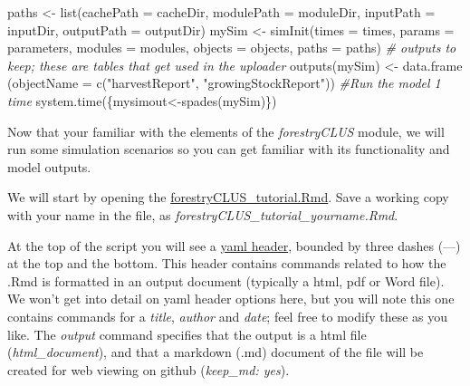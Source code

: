 \documentclass[
]{article}
\newenvironment{Shaded}{\begin{snugshade}}{\end{snugshade}}
\newcommand{\AttributeTok}[1]{\textcolor[rgb]{0.77,0.63,0.00}{#1}}
\newcommand{\CommentTok}[1]{\textcolor[rgb]{0.56,0.35,0.01}{\textit{#1}}}
\newcommand{\FunctionTok}[1]{\textcolor[rgb]{0.00,0.00,0.00}{#1}}
\newcommand{\NormalTok}[1]{#1}
\newcommand{\OtherTok}[1]{\textcolor[rgb]{0.56,0.35,0.01}{#1}}
\newcommand{\StringTok}[1]{\textcolor[rgb]{0.31,0.60,0.02}{#1}}
\begin{document}
\begin{Shaded}
\begin{Highlighting}[]
\NormalTok{paths }\OtherTok{\textless{}{-}} \FunctionTok{list}\NormalTok{(}\AttributeTok{cachePath =}\NormalTok{ cacheDir,}
              \AttributeTok{modulePath =}\NormalTok{ moduleDir,}
              \AttributeTok{inputPath =}\NormalTok{ inputDir,}
              \AttributeTok{outputPath =}\NormalTok{ outputDir)}
\NormalTok{mySim }\OtherTok{\textless{}{-}} \FunctionTok{simInit}\NormalTok{(}\AttributeTok{times =}\NormalTok{ times, }
                 \AttributeTok{params =}\NormalTok{ parameters, }
                 \AttributeTok{modules =}\NormalTok{ modules,}
                 \AttributeTok{objects =}\NormalTok{ objects, }
                 \AttributeTok{paths =}\NormalTok{ paths)}
\CommentTok{\# outputs to keep; these are tables that get used in the uploader}
\FunctionTok{outputs}\NormalTok{(mySim) }\OtherTok{\textless{}{-}} \FunctionTok{data.frame}\NormalTok{ (}\AttributeTok{objectName =} \FunctionTok{c}\NormalTok{(}\StringTok{"harvestReport"}\NormalTok{,}
                                             \StringTok{"growingStockReport"}\NormalTok{))}
\CommentTok{\#Run the model 1 time}
\FunctionTok{system.time}\NormalTok{(\{mysimout}\OtherTok{\textless{}{-}}\FunctionTok{spades}\NormalTok{(mySim)\})}
\end{Highlighting}
\end{Shaded}

Now that your familiar with the elements of the \emph{forestryCLUS}
module, we will run some simulation scenarios so you can get familiar
with its functionality and model outputs.

We will start by opening the
\href{https://github.com/bcgov/clus/blob/main/R/SpaDES-modules/forestryCLUS/forestryCLUS_tutorial.Rmd}{forestryCLUS\_tutorial.Rmd}.
Save a working copy with your name in the file, as
\emph{forestryCLUS\_tutorial\_yourname.Rmd}.

At the top of the script you will see a
\href{https://monashdatafluency.github.io/r-rep-res/yaml-header.html}{yaml
header}, bounded by three dashes (---) at the top and the bottom. This
header contains commands related to how the .Rmd is formatted in an
output document (typically a html, pdf or Word file). We won't get into
detail on yaml header options here, but you will note this one contains
commands for a \emph{title}, \emph{author} and \emph{date}; feel free to
modify these as you like. The \emph{output} command specifies that the
output is a html file (\emph{html\_document}), and that a markdown (.md)
document of the file will be created for web viewing on github
(\emph{keep\_md: yes}).
\end{document}

